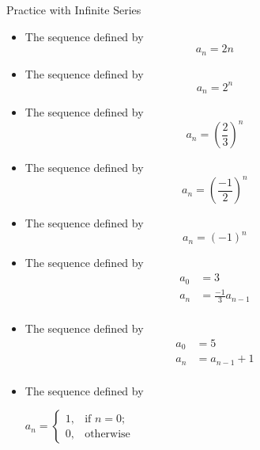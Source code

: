 \begin{exercise}{Practice with Infinite Series \Coffeecup \Coffeecup \Coffeecup}
\begin{itemize}
\item The sequence defined by $$a_n=2n$$
\vspace*{1.5in}
\item The sequence defined by $$a_n=2^n$$
\vspace*{1.5in}
\item The sequence defined by $$ a_n=\left(\frac{2}{3}\right)^n$$
\vspace*{1.5in}
\item The sequence defined by $$ a_n=\left(\frac{-1}{2}\right)^n$$
\vspace*{1.5in}
\item The sequence defined by $$ a_n=\left(-1\right)^n$$
\vspace*{1.5in}
\item The sequence defined by \begin{align*}
 a_0&=3 \\ 
 a_n&=\frac{-1}{3}a_{n-1} \\
\end{align*}
\vspace*{1.5in}
\item The sequence defined by \begin{align*}
 a_0&=5 \\ 
 a_n&=a_{n-1}+1 \\
\end{align*}
\vspace*{1.5in}
\item The sequence defined by \begin{center}
$a_n=\begin{cases}
1, & \text{if $n=0$;} \\
0, & \text{otherwise}
\end{cases}$
\end{center}
\vspace*{1.5in}
\end{itemize}
\end{exercise}
